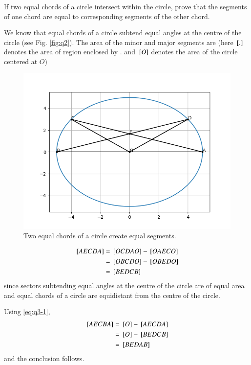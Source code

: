 \documentclass[journal,12pt,twocolumn]{IEEEtran}
\begin{document}
\problem If two equal chords of a circle intersect within the circle, prove 
that the segments of one chord are equal to corresponding segments of the other 
chord.

\solution We know that equal chords of a circle subtend equal angles at the
centre of the circle (see Fig. \eqref{fig:q2}). The area of the minor and major 
segments are (here ${}\left[.\right]$ denotes the area of region enclosed by . and 
${}\left[O\right]$ denotes the area of the circle centered at $O$)

\begin{figure}[!ht]
    \centering
    \includegraphics[width=\columnwidth]{figs/10_4_2.png}
    \caption{Two equal chords of a circle create equal segments.}
    \label{fig:q2}
\end{figure}

\begin{align}
    {}\left[AECDA\right] &= {}\left[OCDAO\right] - {}\left[OAECO\right] \\
                  &= {}\left[OBCDO\right] - {}\left[OBEDO\right] \\
                  &= {}\left[BEDCB\right]
    \label{eq:q3-1}
\end{align}
since sectors subtending equal angles at the centre of the circle are of
equal area and equal chords of a circle are equidistant from the centre of the
circle.

Using \eqref{eq:q3-1},
\begin{align}
    {}\left[AECBA\right] &= {}\left[O\right] - {}\left[AECDA\right] \\
                  &= {}\left[O\right] - {}\left[BEDCB\right] \\
                  &= {}\left[BEDAB\right]
    \label{eq:q3-2}
\end{align}
and the conclusion follows.
\end{document}
